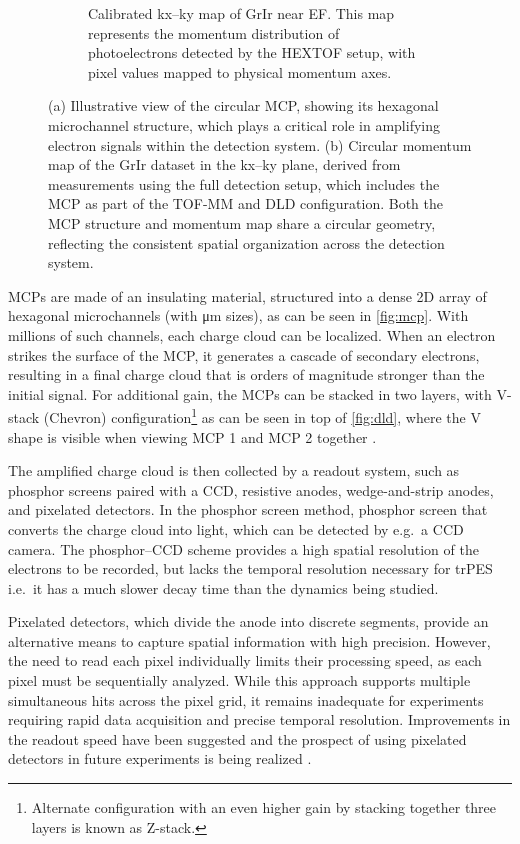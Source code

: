 \begin{figure}[h]
\begin{subfigure}[t]{0.49\linewidth}
        \caption{Calibrated \gls{kx}--\gls{ky} map of \gls{GrIr} near \gls{EF}. This map represents the momentum distribution of photoelectrons detected by the \gls{HEXTOF} setup, with pixel values mapped to physical momentum axes.}
        \label{fig:grir-2d-slice-calibrated}
    \end{subfigure}
    \caption{(a) Illustrative view of the circular \gls{MCP}, showing its hexagonal microchannel structure, which plays a critical role in amplifying electron signals within the detection system. (b) Circular momentum map of the \gls{GrIr} dataset in the \gls{kx}--\gls{ky} plane, derived from measurements using the full detection setup, which includes the \gls{MCP} as part of the \gls{TOF}-\gls{MM} and \gls{DLD} configuration. Both the MCP structure and momentum map share a circular geometry, reflecting the consistent spatial organization across the detection system.}
    \label{fig:combined-figures}
\end{figure}

\Glspl{MCP} are made of an insulating material, structured into a dense 2D array of hexagonal microchannels (with \unit{\micro\meter} sizes), as can be seen in \cref{fig:mcp}. With millions of such channels, each charge cloud can be localized. When an electron strikes the surface of the \gls{MCP}, it generates a cascade of secondary electrons, resulting in a final charge cloud that is orders of magnitude stronger than the initial signal. For additional gain, the \glspl{MCP} can be stacked in two layers, with V-stack (Chevron) configuration\footnote{Alternate configuration with an even higher gain by stacking together three layers is known as Z-stack.}
as can be seen in top of \cref{fig:dld}, where the V shape is visible when viewing MCP 1 and MCP 2 together \cite{ladislaswizaMicrochannelPlateDetectors1979,paschottaMicrochannelPlatesEncyclopedia2019}. 

The amplified charge cloud is then collected by a readout system, such as  phosphor screens paired with a \gls{CCD}, resistive anodes, wedge-and-strip anodes, and pixelated detectors. In the phosphor screen method, phosphor screen that converts the charge cloud into light, which can be detected by e.g.\ a \gls{CCD} camera. The phosphor--\gls{CCD} scheme provides a high spatial resolution of the electrons to be recorded, but lacks the temporal resolution necessary for \gls{trPES} i.e.\ it has a much slower decay time than the dynamics being studied.

Pixelated detectors, which divide the anode into discrete segments, provide an alternative means to capture spatial information with high precision. However, the need to read each pixel individually limits their processing speed, as each pixel must be sequentially analyzed. While this approach supports multiple simultaneous hits across the pixel grid, it remains inadequate for experiments requiring rapid data acquisition and precise temporal resolution. Improvements in the readout speed have been suggested and the prospect of using pixelated detectors in future experiments is being realized \cite{correaTEMPUSTimepix4basedSystem2024}.

